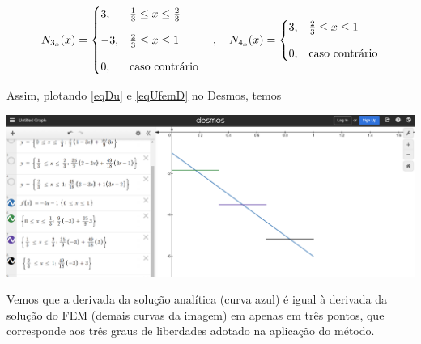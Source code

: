 \documentclass[12pt]{scrartcl}
\begin{document}
\[
    N_{3_x}(x) = \begin{cases}
        3, & \frac{1}{3} \leq x \leq \frac{2}{3} \\
        \noalign{\vskip9pt}
        -3, & \frac{2}{3} \leq x \leq 1           \\
        \noalign{\vskip9pt}
        0,      & \textrm{caso contrário}
    \end{cases}
    \quad , \quad
    N_{4_x}(x) = \begin{cases}
        3, & \frac{2}{3} \leq x \leq 1 \\
        \noalign{\vskip9pt}
        0,      & \textrm{caso contrário}
    \end{cases}
\]

Assim, plotando \eqref{eqDu} e \eqref{eqUfemD} no Desmos, temos

\begin{center}
    \includegraphics[scale=0.35]{grafico_dudx_AA03.png}
\end{center}

Vemos que a derivada da solução analítica (curva azul) é igual à derivada da solução do FEM (demais curvas da imagem) em 
apenas em três pontos, que corresponde aos três graus de liberdades adotado na aplicação do método.
\end{document}
